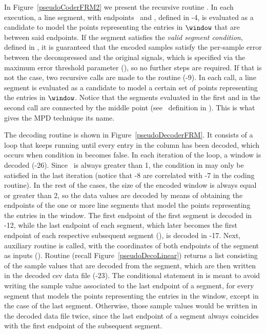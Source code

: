 


\vspace{-8pt}
In Figure~\ref{pseudoCoderFRM2} we present the recursive routine \getDisplacedPointsMethod. In each execution, a line segment, with endpoints \pointo\ and \pointf, defined in -4, is evaluated as a candidate to model the points representing the entries in $\window$ that are between said endpoints. If the segment satisfies the \textit{valid segment condition}, defined in , it is guaranteed that the encoded samples satisfy the per-sample error between the decompressed and the original signals, which is specified via the maximum error threshold parameter (\maxerror), so no further steps are required. If that is not the case, two recursive calls are made to the routine (-9). In each call, a line segment is evaluated as a candidate to model a certain set of points representing the entries in $\window$. Notice that the segments evaluated in the first and in the second call are connected by the middle point (see \half\ definition in ). This is what gives the MPD technique its name.


\vspace{-4pt}



\clearpage


The decoding routine is shown in Figure~\ref{pseudoDecoderFRM}. It consists of a loop that keeps running until every entry in the column has been decoded, which occurs when condition in  becomes false. In each iteration of the loop, a window is decoded (-26). Since \win\ is always greater than 1, the condition in  may only be satisfied in the last iteration (notice that -8 are correlated with -7 in the coding routine). In the rest of the cases, the size of the encoded window is always equal or greater than 2, so the data values are decoded by means of obtaining the endpoints of the one or more line segments that model the points representing the entries in the window. The first endpoint of the first segment is decoded in -12, while the last endpoint of each segment, which later becomes the first endpoint of each respective subsequent segment (), is decoded in -17. Next, auxiliary routine \decodeSegment is called, with the coordinates of both endpoints of the segment as inputs (). Routine \decodeSegment (recall Figure~\ref{pseudoDecoLinear}) returns a list consisting of the sample values that are decoded from the segment, which are then written in the decoded csv data file (-23). The conditional statement in  is meant to avoid writing the sample value associated to the last endpoint of a segment, for every segment that models the points representing the entries in the window, except in the case of the last segment. Otherwise, those sample values would be written in the decoded data file twice, since the last endpoint of a segment always coincides with the first endpoint of the subsequent segment.


